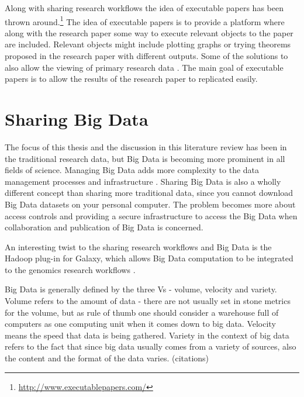 Along with sharing research workflows the idea of executable papers has been
thrown around.\footnote{\url{http://www.executablepapers.com/}} The idea of
executable papers is to provide a platform where along with the research paper
some way to execute relevant objects to the paper are included. Relevant
objects might include plotting graphs or trying theorems proposed in the
research paper with different outputs. Some of the solutions to also allow
the viewing of primary research data
\cite{DBLP:journals/procedia/GorpM11, DBLP:journals/procedia/NowakowskiCHKKBMDM11}.
The main goal of executable papers is to allow the results of the research
paper to replicated easily.

\section{Sharing Big Data}

The focus of this thesis and the discussion in this literature review has been
in the traditional research data, but Big Data is becoming more prominent in
all fields of science. Managing Big Data adds more complexity to the data
management processes and infrastructure
\cite{DBLP:conf/cloudcom/DemchenkoZGWL12}. Sharing Big Data is also a wholly
different concept than sharing more traditional data, since you cannot download
Big Data datasets on your personal computer. The problem becomes more about
access controls and providing a secure infrastructure to access the Big Data
when collaboration and publication of Big Data is concerned.

An interesting twist to the sharing research workflows and Big Data is the
Hadoop plug-in for Galaxy, which allows Big Data computation to be integrated
to the genomics research workflows \cite{DBLP:conf/bcb/PiredduLSZ14}.

\iffalse
Big Data is generally defined by the three Vs - volume, velocity and variety.
Volume refers to the amount of data - there are not usually set in stone
metrics for the volume, but as rule of thumb one should consider a warehouse
full of computers as one computing unit when it comes down to big data.
Velocity means the speed that data is being gathered. Variety in the context
of big data refers to the fact that since big data usually comes from a variety
of sources, also the content and the format of the data varies. (citations)


